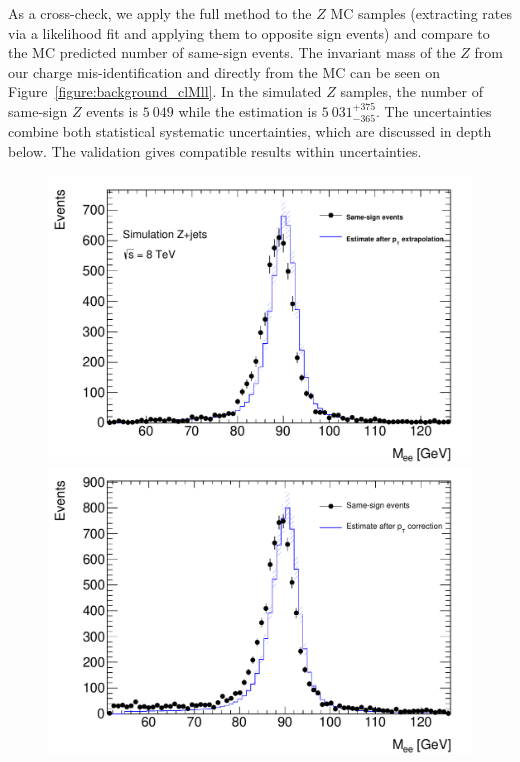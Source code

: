 As a cross-check, we apply the full method to the $Z$ MC samples (extracting rates via a likelihood fit and applying them to opposite sign events) and compare to the MC predicted number of same-sign events. The invariant mass of the $Z$ from our charge mis-identification and directly from the MC can be seen on Figure~\ref{figure:background_clMll}. In the simulated $Z$ samples, the number of same-sign $Z$ events is $5~049$ while the estimation is $5~031^{+375}_{-365}$.  The uncertainties combine both statistical systematic uncertainties, which are discussed in depth below. The validation gives compatible results within uncertainties. 
 
\begin{figure}[htb!]
\centering
\begin{minipage}[h]{0.5\textwidth}
    \centering \includegraphics[width=\textwidth]{figs/qmis/ClosureMllMC}
\end{minipage}\hfill
\begin{minipage}[h]{0.5\textwidth}
    \centering \includegraphics[width=\textwidth]{figs/qmis/ClosureMlldata}

\end{minipage}
\end{figure}
